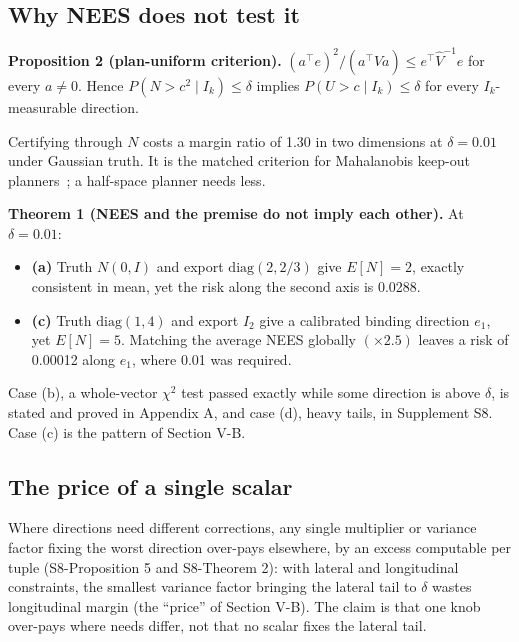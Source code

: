\documentclass{ieeeaccess}
\begin{document}
\subsection{Why NEES does not test it}
\textbf{Proposition 2 (plan-uniform criterion).} $(a^{\top}e)^{2}/(a^{\top}\hat{V}a) \leq e^{\top}\hat{V}^{-1}e$ for every $a \neq 0$. Hence $P(N > c^{2} \mid I_{k}) \leq \delta$ implies $P(U > c \mid I_{k}) \leq \delta$ for every $I_{k}$-measurable direction.

Certifying through $N$ costs a margin ratio of 1.30 in two dimensions at $\delta = 0.01$ under Gaussian truth. It is the matched criterion for Mahalanobis keep-out planners~\cite{Shah2026,Mohamed2025,Pouria2026}; a half-space planner needs less.

\textbf{Theorem 1 (NEES and the premise do not imply each other).} At $\delta = 0.01$:

\begin{itemize}
\item \textbf{(a)} Truth $N(0, I)$ and export $\mathrm{diag}(2, 2/3)$ give $E[N] = 2$, exactly consistent in mean, yet the risk along the second axis is 0.0288.
\item \textbf{(c)} Truth $\mathrm{diag}(1, 4)$ and export $I_{2}$ give a calibrated binding direction $e_{1}$, yet $E[N] = 5$. Matching the average NEES globally $(\times2.5)$ leaves a risk of 0.00012 along $e_{1}$, where 0.01 was required.
\end{itemize}

Case (b), a whole-vector $\chi^{2}$ test passed exactly while some direction is above $\delta$, is stated and proved in Appendix A, and case (d), heavy tails, in Supplement S8. Case (c) is the pattern of Section V-B.

\subsection{The price of a single scalar}
Where directions need different corrections, any single multiplier or variance factor fixing the worst direction over-pays elsewhere, by an excess computable per tuple (S8-Proposition 5 and S8-Theorem 2): with lateral and longitudinal constraints, the smallest variance factor bringing the lateral tail to $\delta$ wastes longitudinal margin (the ``price'' of Section V-B). The claim is that one knob over-pays where needs differ, not that no scalar fixes the lateral tail.
\end{document}
